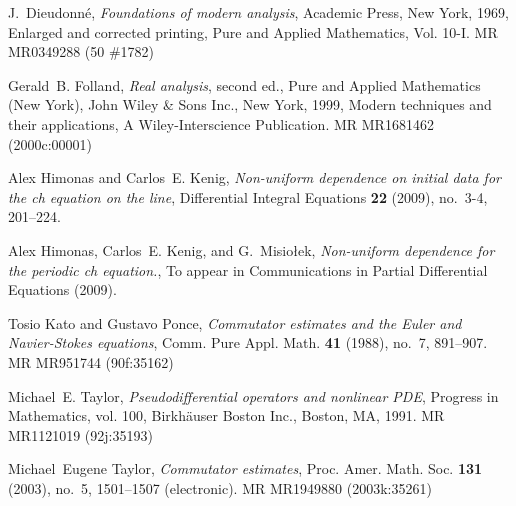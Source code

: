 \documentclass{beamer}
\begin{document}
\begin{thebibliography}{HKM09}

		\providecommand{\bysame}{\leavevmode\hbox to3em{\hrulefill}\thinspace}
\providecommand{\MR}{\relax\ifhmode\unskip\space\fi MR }
\providecommand{\MRhref}[2]{%
  \href{http://www.ams.org/mathscinet-getitem?mr=#1}{#2}
}
\providecommand{\href}[2]{#2}

J.~Dieudonn{{\'e}}, \emph{Foundations of modern analysis}, Academic Press, New
  York, 1969, Enlarged and corrected printing, Pure and Applied Mathematics,
  Vol. 10-I. \MR{MR0349288 (50 \#1782)}

Gerald~B. Folland, \emph{Real analysis}, second ed., Pure and Applied
  Mathematics (New York), John Wiley \& Sons Inc., New York, 1999, Modern
  techniques and their applications, A Wiley-Interscience Publication.
  \MR{MR1681462 (2000c:00001)}

Alex Himonas and Carlos~E. Kenig, \emph{Non-uniform dependence on initial data
  for the ch equation on the line}, Differential Integral Equations \textbf{22}
  (2009), no.~3-4, 201--224.

Alex Himonas, Carlos~E. Kenig, and G.~Misio{\l}ek, \emph{Non-uniform dependence
  for the periodic ch equation.}, To appear in Communications in Partial
  Differential Equations (2009).

Tosio Kato and Gustavo Ponce, \emph{Commutator estimates and the {E}uler and
  {N}avier-{S}tokes equations}, Comm. Pure Appl. Math. \textbf{41} (1988),
  no.~7, 891--907. \MR{MR951744 (90f:35162)}

Michael~E. Taylor, \emph{Pseudodifferential operators and nonlinear {PDE}},
  Progress in Mathematics, vol. 100, Birkh{\"a}user Boston Inc., Boston, MA,
  1991. \MR{MR1121019 (92j:35193)}

Michael~Eugene Taylor, \emph{Commutator estimates}, Proc. Amer. Math. Soc.
  \textbf{131} (2003), no.~5, 1501--1507 (electronic). \MR{MR1949880
  (2003k:35261)}

\end{thebibliography}


%
%

 
\end{document}
